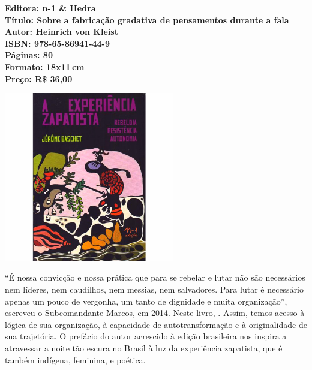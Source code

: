 \hspace*{-.4cm}\begin{minipage}[c]{.5\linewidth}
\small\textbf{
\hspace*{-.1cm}Editora: n-1 \& Hedra\\
Título: Sobre a fabricação gradativa de pensamentos durante a fala\\
Autor: Heinrich von Kleist\\ 
ISBN: 978-65-86941-44-9\\
Páginas: 80\\
Formato: 18x11\,cm\\
Preço: R\$ 36,00\\
}
\end{minipage}

\pagebreak

\begin{center}
\hspace*{.5cm}\includegraphics[width=74mm]{./CAPAS/N-1_EXPERIENCIA.jpg}
\end{center}

\hspace*{-7cm}\hrulefill\hspace*{-7cm}

\medskip

\noindent{}``É nossa convicção e nossa prática que para se rebelar e lutar não são necessários nem líderes, nem caudilhos, nem messias, nem salvadores. Para lutar é necessário apenas um pouco de vergonha, um tanto de dignidade e muita organização'', escreveu o Subcomandante Marcos, em 2014. Neste livro, . Assim, temos acesso à lógica de sua organização, à capacidade de autotransformação e à originalidade de sua trajetória. O prefácio do autor acrescido à edição brasileira nos inspira a atravessar a noite tão escura no Brasil à luz da experiência zapatista, que é também indígena, feminina, e poética.

